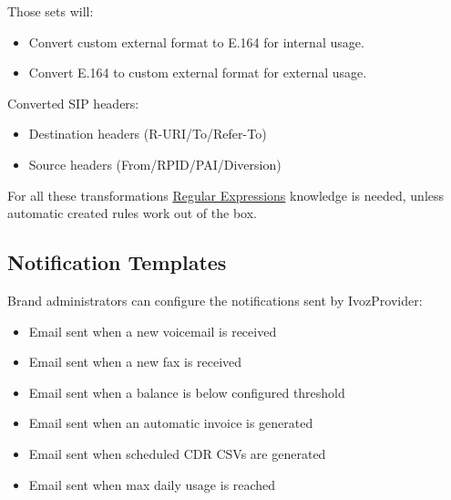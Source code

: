 \documentclass[letterpaper,10pt,spanish]{sphinxmanual}
\begin{document}
Those sets will:
\begin{itemize}
\item {} 
Convert custom external format to E.164 for internal usage.

\item {} 
Convert E.164 to custom external format for external usage.

\end{itemize}

Converted SIP headers:
\begin{itemize}
\item {} 
Destination headers (R-URI/To/Refer-To)

\item {} 
Source headers (From/RPID/PAI/Diversion)

\end{itemize}

For all these transformations \href{http://php.net/manual/en/reference.pcre.pattern.syntax.php}{Regular Expressions} knowledge
is needed, unless automatic created rules work out of the box.


\subsection{Notification Templates}
\label{administration_portal/brand/settings/notification_templates::doc}\label{administration_portal/brand/settings/notification_templates:notification-templates}\label{administration_portal/brand/settings/notification_templates:id1}
Brand administrators can configure the notifications sent by IvozProvider:
\begin{itemize}
\item {} 
Email sent when a new voicemail is received

\item {} 
Email sent when a new fax is received

\item {} 
Email sent when a balance is below configured threshold

\item {} 
Email sent when an automatic invoice is generated

\item {} 
Email sent when scheduled CDR CSVs are generated

\item {} 
Email sent when max daily usage is reached

\end{itemize}
\end{document}
